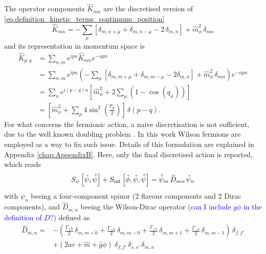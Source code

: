 The operator components $\widehat{K}_{mn}$ are the discretised version of \eqref{eq:definition_kinetic_terms_continuum_position}
\begin{equation}
    \widehat{K}_{mn} = - \sum_\mu \left[\delta_{m,n+\mu} + \delta_{m,n-\mu} - 2 \, \delta_{m,n}\right] + \hat{m}_\phi^2 \, \delta_{mn} 
    \label{eq:discretised_kinetic_op_bosons}
\end{equation}
and its representation in momentum space is
\begin{equation*}
	\begin{aligned}
		\widehat{K}_{p, q} & =\sum_{n, m} e^{i p n} \widehat{K}_{n m} e^{-i q m} \\
		& =\sum_{n, m} e^{i p n}\left(-\sum_\mu\left[\delta_{m,m+\mu}+\delta_{m,m-\mu}-2 \delta_{m, n}\right] + \hat{m}_\phi^2 \, \delta_{mn}\right) e^{-i q m} \\
		& =\sum_{n} e^{i(p-q) n}\left[\hat{m}_\phi^2+2\sum_\mu \left(1-\cos \left(q_\mu\right)\right)\right] \\
		& = \left[\hat{m}_\phi^2 + \sum_\mu 4 \sin ^2\left(\frac{p_\mu}{2}\right) \right] \, \delta(p-q) .
	\end{aligned}
\end{equation*}
For what concerns the fermionic action, a naive discretisation is not sufficient, due to the well known doubling problem \cite{TROVA CITAZIONI}. In this work Wilson fermions \cite{wilson_lqcd} are employed as a way to fix such issue. Details of this formulation are explained in Appendix \ref{chap:AppendixB}. Here, only the final discretised action is reported, which reads
\begin{equation}
		S_\psi\left[\hat{\psi}, \hat{\bar{\psi}} \right] + S_\text{int}\left[\hat{\phi}, \hat{\psi}, \hat{\bar{\psi}} \right] = \hat{\bar{\psi}}_m \, \widehat{D}_{mn} \, \hat{\psi}_n 
\end{equation}
with $\psi_n$ beeing a four-component spinor (2 flavour components and 2 Dirac components), and $\widehat{D}_{m,n}$ beeing the Wilson-Dirac operator \textcolor{blue}{(can I include $g\phi $ in the definition of $D$?)} defined as 
\begin{equation}
    \begin{aligned}
    \widehat{D}_{m, n} = &- \left(\frac{\Gamma_{+0}}{2} \, \delta_{m, m+0} +\frac{\Gamma_{-0}}{2} \, \delta_{m, m-0} + \frac{\Gamma_{+1}}{2} \, \delta_{m, m+1} + \frac{\Gamma_{-1}}{2} \, \delta_{m, m-1}\right) \, \delta _{f, f'} \\
     &+ \left(2ar + \hat m + \hat g \phi\right) \ \delta_{f,f'} \,\delta_{s,s'} \, \delta_{m,n} \\
    \end{aligned}
    \label{eq:wilson-dirac_operator}
\end{equation}
